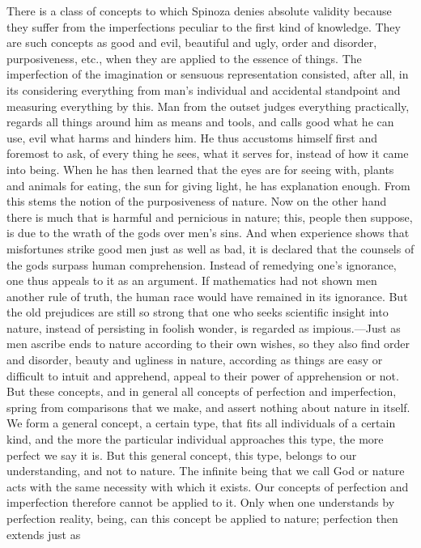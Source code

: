 \documentclass[12pt]{book}
\newcommand{\opage}[1]{\marginnote{\footnotesize\textit{[#1]}}}
\begin{document}
There is a class of concepts to which Spinoza denies absolute validity because they
suffer from the imperfections peculiar to the first kind of knowledge. They are such
concepts as good and evil, beautiful and ugly, order and disorder, purposiveness, etc.,
when they are applied to the essence of things. The imperfection of the imagination or
sensuous representation consisted, after all, in its considering everything from man's
individual and accidental standpoint and measuring everything by this. Man from the
outset judges everything practically, regards all things around him as means and tools,
and calls good what he can use, evil what harms and hinders him. He thus accustoms
himself first and foremost to ask, of \opage{116}every thing he sees, what it serves
for, instead of how it came into being. When he has then learned that the eyes are for
seeing with, plants and animals for eating, the sun for giving light, he has explanation
enough. From this stems the notion of the purposiveness of nature. Now on the other hand
there is much that is harmful and pernicious in nature; this, people then suppose, is
due to the wrath of the gods over men's sins. And when experience shows that misfortunes
strike good men just as well as bad, it is declared that the counsels of the gods
surpass human comprehension. Instead of remedying one's ignorance, one thus appeals to
it as an argument. If mathematics had not shown men another rule of truth, the human
race would have remained in its ignorance. But the old prejudices are still so strong
that one who seeks scientific insight into nature, instead of persisting in foolish
wonder, is regarded as impious.---Just as men ascribe ends to nature according to their
own wishes, so they also find order and disorder, beauty and ugliness in nature,
according as things are easy or difficult to intuit and apprehend, appeal to their
power of apprehension or not. But these concepts, and in general all concepts of
perfection and imperfection, spring from comparisons that we make, and assert nothing
about nature in itself. We form a general concept, a certain type, that fits all
individuals of a certain kind, and the more the particular individual approaches this
type, the more perfect we say it is. But this general concept, this type, belongs to our
\opage{117}understanding, and not to nature. The infinite being that we call God or
nature acts with the same necessity with which it exists. Our concepts of perfection and
imperfection therefore cannot be applied to it. Only when one understands by perfection
reality, being, can this concept be applied to nature; perfection then extends just as
\end{document}
